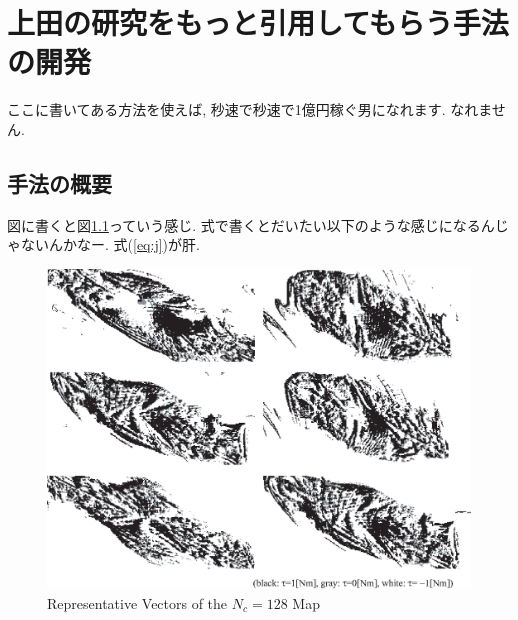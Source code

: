 \chapter{上田の研究をもっと引用してもらう手法の開発}\label{chap:method}

ここに書いてある方法を使えば, 秒速で秒速で1億円稼ぐ男になれます. なれません. 


\section{手法の概要}

図に書くと図\ref{fig:vq_map_128part}っていう感じ. 
式で書くとだいたい以下のような感じになるんじゃないんかなー. 
式(\ref{eq:j})が肝. 

\begin{figure}[h]
        \begin{center}
        \includegraphics[width=1.0\linewidth]{figs/vq_map_128part.eps}
        \caption{Representative Vectors of the $N_c = 128$ Map}
        \label{fig:vq_map_128part}
        \end{center}
\end{figure}




